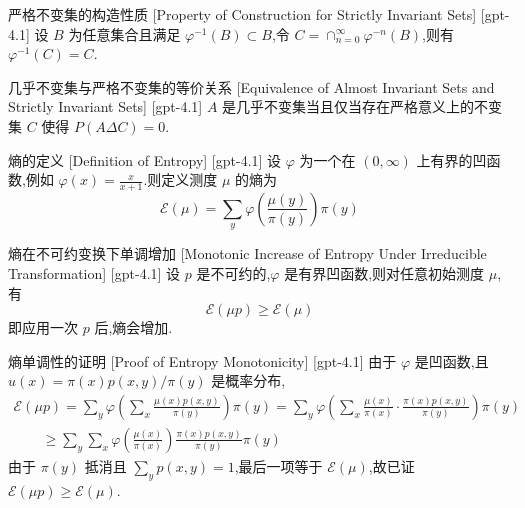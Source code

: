 \documentclass[UTF8]{ctexart}
\begin{document}
    
    
    \begin{ppt}
        {严格不变集的构造性质}
        [Property of Construction for Strictly Invariant Sets]
        [gpt-4.1]
        设 $B$ 为任意集合且满足 $\varphi^{-1}(B) \subset B$,令 $C = \cap_{n=0}^{\infty} \varphi^{-n}(B)$,则有 $\varphi^{-1}(C) = C$.
    \end{ppt}
    
    
    
    \begin{thm}
        {几乎不变集与严格不变集的等价关系}
        [Equivalence of Almost Invariant Sets and Strictly Invariant Sets]
        [gpt-4.1]
        $A$ 是几乎不变集当且仅当存在严格意义上的不变集 $C$ 使得 $P(A \Delta C) = 0$.
    \end{thm}
    
    
    
    \begin{dfn}
        {熵的定义}
        [Definition of Entropy]
        [gpt-4.1]
        设 $\varphi$ 为一个在 $(0, \infty)$ 上有界的凹函数,例如 $\varphi(x) = \frac{x}{x+1}$.则定义测度 $\mu$ 的熵为
\[
\mathcal{E}(\mu) = \sum_{y} \varphi \left( \frac{\mu(y)}{\pi(y)} \right) \pi(y)
\]

    \end{dfn}
    
    
    
    \begin{thm}
        {熵在不可约变换下单调增加}
        [Monotonic Increase of Entropy Under Irreducible Transformation]
        [gpt-4.1]
        设 $p$ 是不可约的,$\varphi$ 是有界凹函数,则对任意初始测度 $\mu$,有
\[
\mathcal{E}(\mu p) \geq \mathcal{E}(\mu)
\]
即应用一次 $p$ 后,熵会增加.

    \end{thm}
    
    
    
    \begin{prf}
        {熵单调性的证明}
        [Proof of Entropy Monotonicity]
        [gpt-4.1]
        由于 $\varphi$ 是凹函数,且 $
u(x) = \pi(x) p(x, y) / \pi(y)$ 是概率分布,
\[
\begin{array}{l}
  \displaystyle \mathcal{E}(\mu p) = \sum_{y} \varphi \left( \sum_{x} \frac{\mu(x) p(x, y)}{\pi(y)} \right) \pi(y) = \sum_{y} \varphi \left( \sum_{x} \frac{\mu(x)}{\pi(x)} \cdot \frac{\pi(x) p(x, y)}{\pi(y)} \right) \pi(y) \\
  \displaystyle \qquad \geq \sum_{y} \sum_{x} \varphi \left( \frac{\mu(x)}{\pi(x)} \right) \frac{\pi(x) p(x, y)}{\pi(y)} \pi(y)
\end{array}
\]
由于 $\pi(y)$ 抵消且 $\sum_{y} p(x, y) = 1$,最后一项等于 $\mathcal{E}(\mu)$,故已证 $\mathcal{E}(\mu p) \geq \mathcal{E}(\mu)$.

    \end{prf}
    
\end{document}
